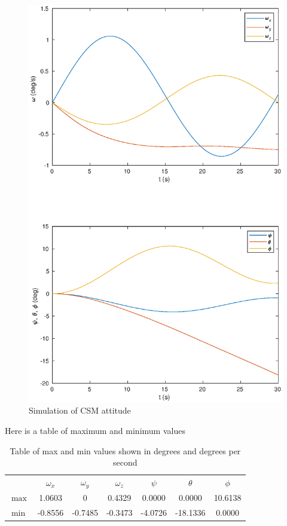 \documentclass[a4paper]{article}
\begin{document}
\begin{enumerate}[a.]
\begin{figure}[H]
\begin{center}
      \includegraphics[scale=0.7]{task_e_c.eps}
    \end{center}
    \caption{Simulation of CSM attitude}
    \end{figure}
    Here is a table of maximum and minimum values
    \begin{table}[H]
      \centering
      \begin{tabular}{lcccccc}
        & $\omega_x$ & $\omega_y$ & $\omega_z$ & $\psi$ & $\theta$ & $\phi$ \\
        $\max$ &  1.0603 & 0 & 0.4329 & 0.0000 & 0.0000 & 10.6138 \\
        $\min$ & -0.8556 & -0.7485 & -0.3473 & -4.0726& -18.1336 & 0.0000 \\
      \end{tabular}
      \caption{Table of max and min values shown in degrees and degrees per second}
    \end{table}
\end{enumerate}
\end{document}
